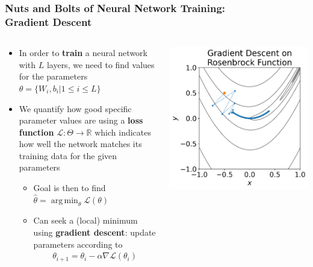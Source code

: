 \documentclass[xcolor={x11names,table}]{beamer}
\DeclareMathOperator*{\argmin}{arg\,min}
\begin{document}
\begin{frame}
	\frametitle{Nuts and Bolts of Neural Network Training:\\Gradient Descent}
	\begin{columns}
		\begin{column}{0.65\textwidth}
			\begin{itemize}
				\item In order to \textbf{train} a neural network with $L$ layers, we need to find values for the parameters $\theta=\{W_{i},b_{i}|1\leq i\leq L\}$
				\item We quantify how good specific parameter values are using a \textbf{loss function} $\mathcal{L}:\Theta\to\mathbb{R}$ which indicates how well the network matches its training data for the given parameters
				\begin{itemize}
					\item Goal is then to find $\hat{\theta}=\argmin_{\theta}\mathcal{L}(\theta)$
					\item Can seek a (local) minimum using \textbf{gradient descent}: update parameters according to
					\begin{gather*}
						\theta_{i+1}=\theta_{i}-\alpha\nabla\mathcal{L}(\theta_{i})
					\end{gather*}
				\end{itemize}
			\end{itemize}
		\end{column}
		\begin{column}{0.45\textwidth}
			\includegraphics[width=\textwidth]{rosenbrock}
		\end{column}
	\end{columns}
\end{frame}
\end{document}
